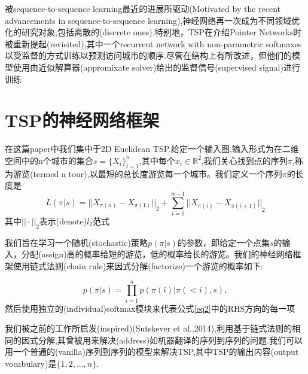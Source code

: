 \documentclass[a4paper,UTF8]{ctexart}
\theoremstyle{definition}
\begin{document}
被sequence-to-sequence learning最近的进展所驱动(Motivated by the recent advancements in sequence-to-sequence learning),神经网络再一次成为不同领域优化的研究对象,包括离散的(discrete ones).特别地，TSP在介绍Pointer Networks时被重新提起(revisited),其中一个recurrent network with non-parametric
softmaxes 以受监督的方式训练以预测访问城市的顺序.尽管在结构上有所改进，但他们的模型使用由近似解算器(appromixate solver)给出的监督信号(supervised signal)进行训练

\section{TSP的神经网络框架}
在这篇paper中我们集中于2D Euclidean TSP.给定一个输入图,输入形式为在二维空间中的n个城市的集合$s=\{{X_i}\}^n_{i=1}$,其中每个$x_i \in \mathbb{R}^2$,我们关心找到点的序列$\pi$,称为游览(termed a tour),以最短的总长度游览每一个城市。我们定义一个序列$\pi$的长度是
\begin{equation}
L(\pi | s)={||X_{\pi (n)}-X_{\pi (1)}||}_2+\sum_{i=1}^{n-1} {||X_{\pi (i)}-X_{\pi (i+1)}||}_2
\end{equation}
其中${||\cdot||}_2$表示(denote)$l_2$范式

我们旨在学习一个随机(stochastic)策略$p(\pi | s)$的参数，即给定一个点集$s$的输入，分配(assign)高的概率给短的游览，低的概率给长的游览。我们的神经网络框架使用链式法则(chain rule)来因式分解(factorize)一个游览的概率如下:

\begin{equation}\label{eq2}
p(\pi |s)=\prod_{i=1}^n p(\pi (i)| \pi (< i),s),
\end{equation}
然后使用独立的(individual)softmax模块来代表公式\eqref{eq2}中的RHS方向的每一项

我们被之前的工作所启发(inspired)(Sutskever et al.,2014),利用基于链式法则的相同的因式分解,其曾被用来解决(address)如机器翻译的序列到序列的问题.我们可以用一个普通的(vanilla)序列到序列的模型来解决TSP,其中TSP的输出内容(output vocabulary)是$\{1,2,...,n\}$.
\end{document}
